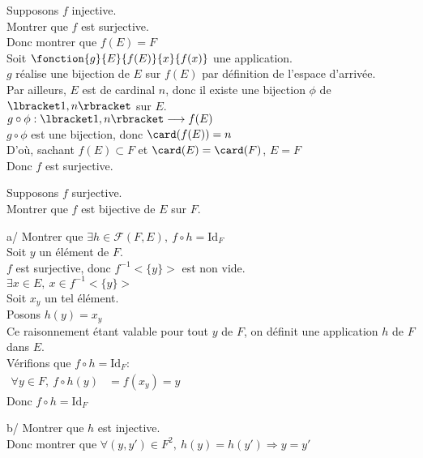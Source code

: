 \documentclass[12pt,twoside,a4paper]{article}
\begin{document}
	\begin{preuve}
		\begin{liste}
			\item[\cercle1]Supposons $f$ injective.\\
				Montrer que $f$ est surjective.\\
				Donc montrer que $f(E)=F$\\
				Soit $\fonction{g}{E}{f(E)}{x}{f(x)}$ une application.\\
				$g$ réalise une bijection de $E$ sur $f(E)$ par définition de l'espace d'arrivée.\\
				Par ailleurs, $E$ est de cardinal $n$, donc il existe une bijection $\phi$ de $\lbracket 1,n\rbracket$ sur $E$.\\
				$g\circ \phi:\lbracket 1,n\rbracket\longrightarrow f(E)$\\
				$g\circ\phi$ est une bijection, donc $\card(f(E))=n$\\
				D'o\`u, sachant $f(E)\subset F$ et $\card(E)=\card(F)$, $E=F$\\
				Donc $f$ est surjective.
			\item[\cercle2]Supposons $f$ surjective.\\
				Montrer que $f$ est bijective de $E$ sur $F$.
				\begin{liste}
					\item[a/] Montrer que $\exists h\in\mathcal{F}(F,E),\ f\circ h=\text{Id}_F$\\
						Soit $y$ un élément de $F$.\\
						$f$ est surjective, donc $f^{-1}<\{y\}>$ est non vide.\\
						$\exists x\in E,\ x\in f^{-1}<\{y\}>$\\
						Soit $x_y$ un tel élément.\\
						Posons $h(y)=x_y$\\
						Ce raisonnement étant valable pour tout $y$ de $F$, on définit une application $h$ de $F$ dans $E$.\\
						Vérifions que $f\circ h=\text{Id}_F$:\\
						$\begin{aligned}
						\forall y\in F,\ f\circ h(y)&=f(x_y)=y
						\end{aligned}$\\
						Donc $f\circ h=\text{Id}_F$
					\item[b/] Montrer que $h$ est injective.\\
						Donc montrer que $\forall (y,y')\in F^{2},\ h(y)=h(y')\Rightarrow y=y'$\\

\end{liste}
\end{liste}
\end{preuve}
\end{document}
